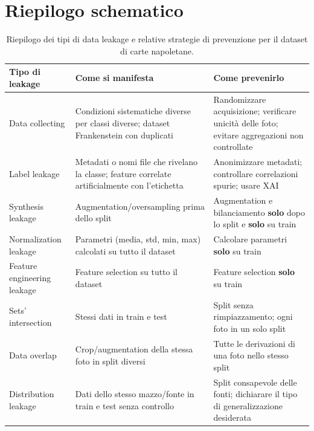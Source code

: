 \documentclass[a4paper,12pt]{article}
\begin{document}
\section{Riepilogo schematico}

\begin{table}[h!]
\centering
\small
\renewcommand{\arraystretch}{1.3}
\begin{tabular}{@{}p{3.5cm}p{5.5cm}p{5.5cm}@{}}
\toprule
\textbf{Tipo di leakage} & \textbf{Come si manifesta} & \textbf{Come prevenirlo} \\
\midrule
Data collecting & Condizioni sistematiche diverse per classi diverse; dataset Frankenstein con duplicati & Randomizzare acquisizione; verificare unicità delle foto; evitare aggregazioni non controllate \\
\midrule
Label leakage & Metadati o nomi file che rivelano la classe; feature correlate artificialmente con l'etichetta & Anonimizzare metadati; controllare correlazioni spurie; usare XAI \\
\midrule
Synthesis leakage & Augmentation/oversampling prima dello split & Augmentation e bilanciamento \textbf{solo} dopo lo split e \textbf{solo} su train \\
\midrule
Normalization leakage & Parametri (media, std, min, max) calcolati su tutto il dataset & Calcolare parametri \textbf{solo} su train \\
\midrule
Feature engineering leakage & Feature selection su tutto il dataset & Feature selection \textbf{solo} su train \\
\midrule
Sets' intersection & Stessi dati in train e test & Split senza rimpiazzamento; ogni foto in un solo split \\
\midrule
Data overlap & Crop/augmentation della stessa foto in split diversi & Tutte le derivazioni di una foto nello stesso split \\
\midrule
Distribution leakage & Dati dello stesso mazzo/fonte in train e test senza controllo & Split consapevole delle fonti; dichiarare il tipo di generalizzazione desiderata \\
\bottomrule
\end{tabular}
\caption{Riepilogo dei tipi di data leakage e relative strategie di prevenzione per il dataset di carte napoletane.}
\label{tab:riepilogo}
\end{table}
\end{document}
